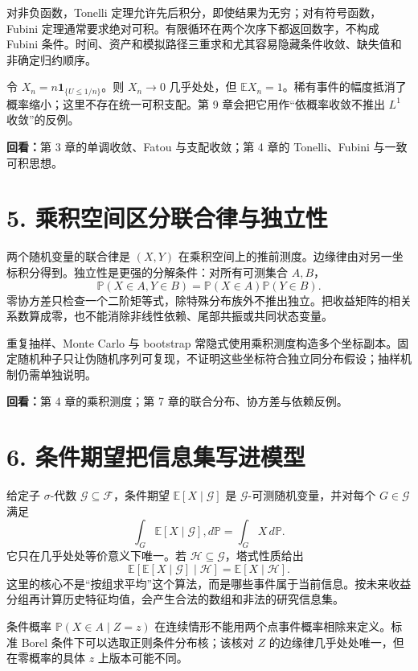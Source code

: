 对非负函数，Tonelli 定理允许先后积分，即使结果为无穷；对有符号函数，Fubini 定理通常要求绝对可积。有限循环在两个次序下都返回数字，不构成 Fubini 条件。时间、资产和模拟路径三重求和尤其容易隐藏条件收敛、缺失值和非确定归约顺序。

\begin{example}
令 $X_n=n\mathbf1_{\{U\le1/n\}}$。则 $X_n\to0$ 几乎处处，但 $\mathbb E X_n=1$。稀有事件的幅度抵消了概率缩小；这里不存在统一可积支配。第 9 章会把它用作“依概率收敛不推出 $L^1$ 收敛”的反例。
\end{example}

\noindent\textbf{回看：}第 3 章的单调收敛、Fatou 与支配收敛；第 4 章的 Tonelli、Fubini 与一致可积思想。

\section*{5. 乘积空间区分联合律与独立性}

两个随机变量的联合律是 $(X,Y)$ 在乘积空间上的推前测度。边缘律由对另一坐标积分得到。独立性是更强的分解条件：对所有可测集合 $A,B$，
\[
 \mathbb P(X\in A,Y\in B)=\mathbb P(X\in A)\mathbb P(Y\in B).
\]
零协方差只检查一个二阶矩等式，除特殊分布族外不推出独立。把收益矩阵的相关系数算成零，也不能消除非线性依赖、尾部共振或共同状态变量。

重复抽样、Monte Carlo 与 bootstrap 常隐式使用乘积测度构造多个坐标副本。固定随机种子只让伪随机序列可复现，不证明这些坐标符合独立同分布假设；抽样机制仍需单独说明。

\noindent\textbf{回看：}第 4 章的乘积测度；第 7 章的联合分布、协方差与依赖反例。

\section*{6. 条件期望把信息集写进模型}

给定子 $\sigma$-代数 $\mathcal G\subseteq\mathcal F$，条件期望 $\mathbb E[X\mid\mathcal G]$ 是 $\mathcal G$-可测随机变量，并对每个 $G\in\mathcal G$ 满足
\[
 \int_G \mathbb E[X\mid\mathcal G],d\mathbb P
 =\int_G X\,d\mathbb P.
\]
它只在几乎处处等价意义下唯一。若 $\mathcal H\subseteq\mathcal G$，塔式性质给出
\[
 \mathbb E[\mathbb E[X\mid\mathcal G]\mid\mathcal H]
 =\mathbb E[X\mid\mathcal H].
\]
这里的核心不是“按组求平均”这个算法，而是哪些事件属于当前信息。按未来收益分组再计算历史特征均值，会产生合法的数组和非法的研究信息集。

条件概率 $\mathbb P(X\in A\mid Z=z)$ 在连续情形不能用两个点事件概率相除来定义。标准 Borel 条件下可以选取正则条件分布核；该核对 $Z$ 的边缘律几乎处处唯一，但在零概率的具体 $z$ 上版本可能不同。

